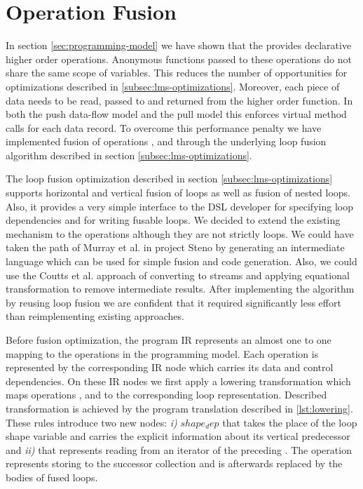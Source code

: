 \section{Operation Fusion}
\label{sec:fusion}

In section \ref{sec:programming-model} we have shown that the  provides declarative higher order operations. Anonymous functions passed to these operations do not share the same scope of variables. This reduces the number of opportunities for optimizations described in \ref{subsec:lms-optimizations}. Moreover, each piece of data needs to be read, passed to and returned from the higher order function. In both the push data-flow model and the pull model this enforces virtual method calls \cite{murray_steno:_2011} for each data record. To overcome this performance penalty we have implemented fusion of operations ,  and  through the underlying loop fusion algorithm described in section \ref{subsec:lms-optimizations}. 

The loop fusion optimization described in section \ref{subsec:lms-optimizations} supports horizontal and vertical fusion of loops as well as fusion of nested loops. Also, it provides a very simple interface to the DSL developer for specifying loop dependencies and for writing fusable loops. We decided to extend the existing mechanism to the  operations although they are not strictly loops. We could have taken the path of Murray et al. in project Steno \cite{murray_steno:_2011} by generating an intermediate language which can be used for simple fusion and code generation. Also, we could use the Coutts et al. \cite{coutts_stream_2007} approach of converting  to streams and applying equational transformation to remove intermediate results. After implementing the algorithm by reusing loop fusion we are confident that it required significantly less effort than reimplementing existing approaches.

Before fusion optimization, the program IR represents an almost one to one mapping to the operations in the programming model. Each operation is represented by the corresponding IR node which carries its data and control dependencies. On these IR nodes we first apply a lowering transformation which maps operations ,  and  to the corresponding loop representation. Described transformation is achieved by the program translation described in \ref{lst:lowering}. These rules introduce two new nodes: \emph{i)} $shape_dep$ that takes the place of the loop shape variable and carries the explicit information about its vertical predecessor and \emph{ii)}  that represents reading from an iterator of the preceding . The  operation represents storing to the successor collection and is afterwards replaced by the bodies of fused loops.

